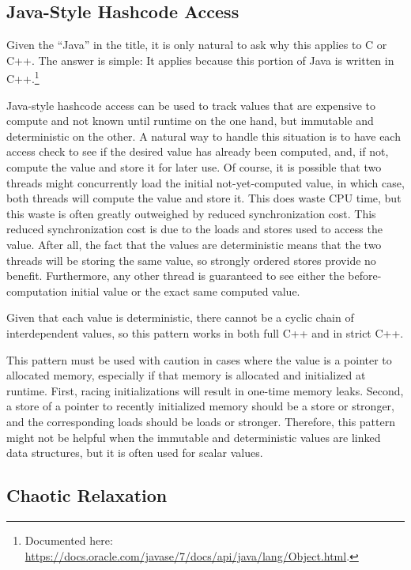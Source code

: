 \documentclass[10]{article}
\begin{document}
\subsection{Java-Style Hashcode Access}
\label{sec:Java-Style Hashcode Access}

Given the ``Java'' in the title, it is only natural to ask why this
applies to C or C++.
The answer is simple:
It applies because this portion of Java is written in C++.\footnote{
	Documented here:
	\url{https://docs.oracle.com/javase/7/docs/api/java/lang/Object.html}.}

Java-style hashcode access can be used to track values that are expensive
to compute and not known until runtime on the one hand, but immutable
and deterministic on the other.
A natural way to handle this situation is to have each access check
to see if the desired value has already been computed, and, if not,
compute the value and store it for later use.
Of course, it is possible that two threads might concurrently load
the initial not-yet-computed value, in which case, both threads
will compute the value and store it.
This does waste CPU time, but this waste is often greatly outweighed by
reduced synchronization cost.
This reduced synchronization cost is due to the 
loads and stores used to access the value.
After all, the fact that the values are deterministic means that
the two threads will be storing the same value, so strongly ordered
stores provide no benefit.
Furthermore, any other thread is guaranteed to see either the
before-computation initial value or the exact same computed value.

Given that each value is deterministic, there cannot be a cyclic chain
of interdependent values, so this pattern works in both full C++ and in
strict C++.

This pattern must be used with caution in cases where the value is
a pointer to allocated memory, especially if that memory is allocated
and initialized at runtime.
First, racing initializations will result in one-time memory leaks.
Second, a store of a pointer to recently initialized memory should
be a  store or stronger, and the corresponding
loads should be  loads or stronger.
Therefore, this pattern might not be helpful when the immutable and
deterministic values are linked data structures, but it is often used
for scalar values.

\subsection{Chaotic Relaxation}
\label{sec:Chaotic Relaxation}
\end{document}
